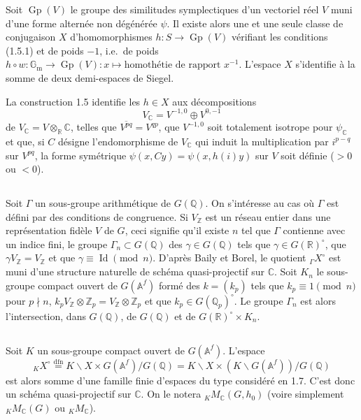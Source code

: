 \documentclass[11pt]{amsart}
\theoremstyle{plain}
\theoremstyle{definition}
\DeclareMathOperator{\Gp}{Gp}
\DeclareMathOperator{\Id}{Id}
\newcommand{\ZZ}{\mathbb{Z}}
\newcommand{\QQ}{\mathbb{Q}}
\newcommand{\RR}{\mathbb{R}}
\newcommand{\CC}{\mathbb{C}}
\newcommand{\AAf}{\mathbb{A}^f}
\newcommand{\MC}{M_{\mathbb{C}}}
\begin{document}
Soit $\Gp(V)$ le groupe des similitudes symplectiques d'un vectoriel r\'eel $V$ muni d'une forme altern\'ee non d\'eg\'en\'er\'ee $\psi$. Il existe alors une et une seule classe de conjugaison $X$ d'homomorphismes $h : S \to \Gp(V)$ v\'erifiant les conditions (1.5.1) et de poids $-1$, i.e.\ de poids $h \circ w : \mathbb{G}_{\mathrm{m}} \to \Gp(V) : x \mapsto \text{homoth\'etie de rapport } x^{-1}$. L'espace $X$ s'identifie \`a la somme de deux demi-espaces de Siegel.

La construction 1.5 identifie les $h \in X$ aux d\'ecompositions
\[
V_{\CC} = V^{-1,0} \oplus V^{0,-1}
\]
de $V_{\CC} = V \otimes_{\RR} \CC$, telles que $\overline{V^{pq}} = V^{qp}$, que $V^{-1,0}$ soit totalement isotrope pour $\psi_{\CC}$ et que, si $C$ d\'esigne l'endomorphisme de $V_{\CC}$ qui induit la multiplication par $i^{p-q}$ sur $V^{pq}$, la forme sym\'etrique $\psi(x,Cy) = \psi(x, h(i)y)$ sur $V$ soit d\'efinie ($> 0$ ou $< 0$).

\subsection{}

Soit $\Gamma$ un sous-groupe arithm\'etique de $G(\QQ)$. On s'int\'eresse au cas o\`u $\Gamma$ est d\'efini par des conditions de congruence. Si $V_{\ZZ}$ est un r\'eseau entier dans une repr\'esentation fid\`ele $V$ de $G$, ceci signifie qu'il existe $n$ tel que $\Gamma$ contienne avec un indice fini, le groupe $\Gamma_n \subset G(\QQ)$ des $\gamma \in G(\QQ)$ tels que $\gamma \in G(\RR)^\circ$, que $\gamma V_{\ZZ} = V_{\ZZ}$ et que $\gamma \equiv \Id \pmod n$. D'apr\`es Baily et Borel, le quotient ${}_\Gamma X^\circ$ est muni d'une structure naturelle de sch\'ema quasi-projectif sur $\CC$. Soit $K_n$ le sous-groupe compact ouvert de $G(\AAf)$ form\'e des $k = (k_p)$ tels que $k_p \equiv 1 \pmod n$ pour $p \nmid n$, $k_p V_{\ZZ} \otimes \ZZ_p = V_{\ZZ} \otimes \ZZ_p$ et que $k_p \in G(\QQ_p)^\circ$. Le groupe $\Gamma_n$ est alors l'intersection, dans $G(\QQ)$, de $G(\QQ)$ et de $G(\RR)^\circ \times K_n$.

\subsection{}

Soit $K$ un sous-groupe compact ouvert de $G(\AAf)$. L'espace
\[
{}_K X^\circ \overset{\text{dfn}}{=} K \backslash X \times G(\AAf)/G(\QQ) = K \backslash X \times (K \backslash G(\AAf))/G(\QQ)
\]
est alors somme d'une famille finie d'espaces du type consid\'er\'e en 1.7. C'est donc un sch\'ema quasi-projectif sur $\CC$. On le notera ${}_K \MC(G,h_0)$ (voire simplement ${}_K \MC(G)$ ou ${}_K \MC$).
\end{document}
